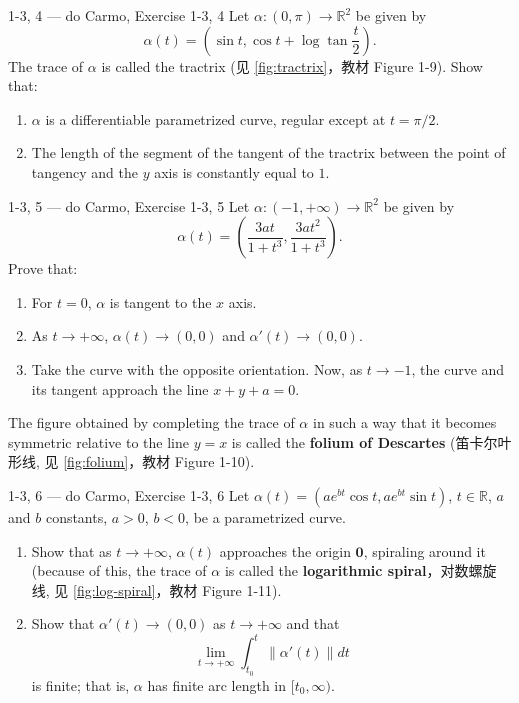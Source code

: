 \begin{exercise}{1-3, 4 — do Carmo, Exercise 1-3, 4}
Let $\alpha: (0, \pi) \to \mathbb{R}^2$ be given by
\[
\alpha(t) = \left(\sin t, \cos t + \log \tan \frac{t}{2}\right).
\]
The trace of $\alpha$ is called the tractrix (见 \cref{fig:tractrix}，教材 Figure 1-9). Show that:
\begin{enumerate}
\item[a.] $\alpha$ is a differentiable parametrized curve, regular except at $t = \pi/2$.
\item[b.] The length of the segment of the tangent of the tractrix between the point of tangency and the $y$ axis is constantly equal to $1$.
\end{enumerate}
\end{exercise}

\begin{exercise}{1-3, 5 — do Carmo, Exercise 1-3, 5}
Let $\alpha: (-1, +\infty) \to \mathbb{R}^2$ be given by
\[
\alpha(t) = \left(\frac{3at}{1+t^3}, \frac{3at^2}{1+t^3}\right).
\]
Prove that:
\begin{enumerate}
\item[a.] For $t = 0$, $\alpha$ is tangent to the $x$ axis.
\item[b.] As $t \to +\infty$, $\alpha(t) \to (0,0)$ and $\alpha'(t) \to (0,0)$.
\item[c.] Take the curve with the opposite orientation. Now, as $t \to -1$, the curve and its tangent approach the line $x + y + a = 0$.
\end{enumerate}
The figure obtained by completing the trace of $\alpha$ in such a way that it becomes symmetric relative to the line $y = x$ is called the \textbf{folium of Descartes} (笛卡尔叶形线, 见 \cref{fig:folium}，教材 Figure 1-10).
\end{exercise}

\begin{exercise}{1-3, 6 — do Carmo, Exercise 1-3, 6}
Let $\alpha(t) = (ae^{bt}\cos t, ae^{bt}\sin t)$, $t \in \mathbb{R}$, $a$ and $b$ constants, $a > 0$, $b < 0$, be a parametrized curve.
\begin{enumerate}
\item[a.] Show that as $t \to +\infty$, $\alpha(t)$ approaches the origin $\mathbf{0}$, spiraling around it (because of this, the trace of $\alpha$ is called the \textbf{logarithmic spiral}，对数螺旋线, 见 \cref{fig:log-spiral}，教材 Figure 1-11).
\item[b.] Show that $\alpha'(t) \to (0,0)$ as $t \to +\infty$ and that
\[
\lim_{t \to +\infty} \int_{t_0}^t \|\alpha'(t)\| dt
\]
is finite; that is, $\alpha$ has finite arc length in $[t_0, \infty)$.
\end{enumerate}
\end{exercise}

